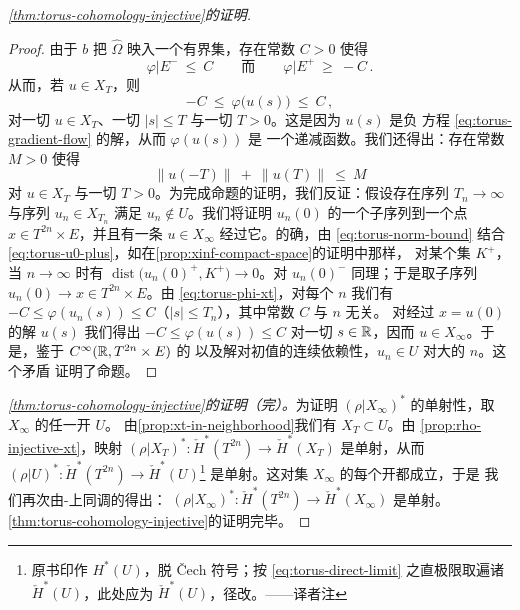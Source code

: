 \begin{proof}[\cref*{thm:torus-cohomology-injective}的证明]
\begin{proof}
由于 $b$ 把 $\widehat{\Omega}$ 映入一个有界集，存在常数 $C>0$ 使得
\begin{equation}\label{eq:torus-phi-restriction}
\varphi\big|E^{-}\ \leq\ C\qquad\text{而}\qquad\varphi\big|E^{+}\ \geq\ -C\,.
\end{equation}
从而，若 $u\in X_{T}$，则
\begin{equation}\label{eq:torus-phi-xt}
-C\ \leq\ \varphi\bigl(u(s)\bigr)\ \leq\ C\,,
\end{equation}
对一切 $u\in X_{T}$、一切 $|s|\leq T$ 与一切 $T>0$。这是因为 $u(s)$ 是负%
\trGradient{}方程 \eqref{eq:torus-gradient-flow} 的解，从而 $\varphi(u(s))$ 是%
一个\trMonotone{}递减函数。我们还得出：存在常数 $M>0$ 使得
\begin{equation}\label{eq:torus-norm-bound}
\|u(-T)\|\ +\ \|u(T)\|\ \leq\ M
\end{equation}
对 $u\in X_{T}$ 与一切 $T>0$。为完成命题的证明，我们反证：假设存在序列%
$T_{n}\to\infty$ 与序列 $u_{n}\in X_{T_{n}}$ 满足 $u_{n}\notin U$。我们将证明%
$u_{n}(0)$ 的一个子序列\trConverge{}到一个点 $x\in T^{2n}\times E$，并且有一条%
\trBounded\trOrbit{} $u\in X_{\infty}$ 经过它。的确，由 \eqref{eq:torus-norm-bound}%
结合 \eqref{eq:torus-u0-plus}，如在\cref{prop:xinf-compact-space}的证明中那样，%
对某个\trCompact{}集 $K^{+}$，当 $n\to\infty$ 时有 $\operatorname{dist}%
\bigl(u_{n}(0)^{+},K^{+}\bigr)\to0$。对 $u_{n}(0)^{-}$ 同理；于是取子序列%
$u_{n}(0)\to x\in T^{2n}\times E$。由 \eqref{eq:torus-phi-xt}，对每个 $n$ 我们有%
$-C\leq\varphi(u_{n}(s))\leq C$（$|s|\leq T_{n}$），其中常数 $C$ 与 $n$ 无关。%
对经过 $x=u(0)$ 的解 $u(s)$ 我们得出 $-C\leq\varphi(u(s))\leq C$ 对一切%
$s\in\mathbb{R}$，因而 $u\in X_{\infty}$。于是，鉴于 $C^{\infty}(\mathbb{R},T^{2n}\times E)$ 的%
\trTopology{}以及解对初值的连续依赖性，$u_{n}\in U$ 对大的 $n$。这个矛盾%
证明了命题。
\end{proof}

\emph{\cref*{thm:torus-cohomology-injective}的证明（完）。}\quad 为证明%
$(\rho|X_{\infty})^{*}$ 的单射性，取 $X_{\infty}$ 的任一开\trNeighborhood{} $U$。%
由\cref{prop:xt-in-neighborhood}我们有 $X_{T}\subset U$。由%
\cref{prop:rho-injective-xt}，映射 $(\rho|X_{T})^{*}:\check{H}^{*}(T^{2n})\to%
\check{H}^{*}(X_{T})$ 是单射，从而 $(\rho|U)^{*}:\check{H}^{*}(T^{2n})\to%
\check{H}^{*}(U)$\footnote{原书印作 $H^{*}(U)$，脱 Čech 符号；按%
\eqref{eq:torus-direct-limit} 之直极限取遍诸 $\check{H}^{*}(U)$，此处应为%
$\check{H}^{*}(U)$，径改。——译者注}%
是单射。这对\trCompact{}集 $X_{\infty}$ 的每个开\trNeighborhood{}都成立，于是%
我们再次由\trAlexander-\trSpanier{}上同调的\trContinuity{}得出：%
$(\rho|X_{\infty})^{*}:\check{H}^{*}(T^{2n})\to\check{H}^{*}(X_{\infty})$ 是单射。%
\cref{thm:torus-cohomology-injective}的证明完毕。
\end{proof}

